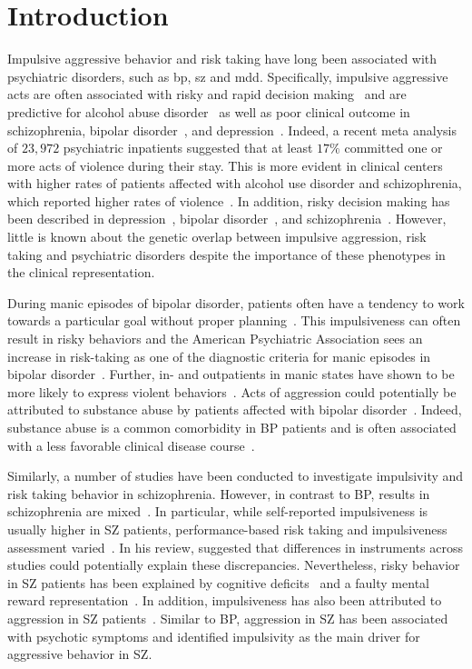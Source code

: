 \section{Introduction}
\label{sec:uk_biobank_psych_introduction}

Impulsive aggressive behavior and risk taking have long been associated with psychiatric disorders, such as \acrfull{bp}, \acrfull{sz} and \acrfull{mdd}.
Specifically, impulsive aggressive acts are often associated with risky and rapid decision making~\cite{Moeller2001} and are predictive for alcohol abuse disorder~\cite{Courtney2012} as well as poor clinical outcome in schizophrenia, bipolar disorder~\cite{Gut-Fayand2001}, and depression~\cite{Dutton2013}.
Indeed, a recent meta analysis of $23,972$ psychiatric inpatients suggested that at least $17\%$ committed one or more acts of violence during their stay.
This is more evident in clinical centers with higher rates of patients affected with alcohol use disorder and schizophrenia, which reported higher rates of violence~\cite{Iozzino2015}. 
In addition, risky decision making has been described in depression~\cite{Wilson2010}, bipolar disorder~\cite{Johnson2012}, and schizophrenia~\cite{Cheng2012}.
However, little is known about the genetic overlap between impulsive aggression, risk taking and psychiatric disorders despite the importance of these phenotypes in the clinical representation.

During manic episodes of bipolar disorder, patients often have a tendency to work towards a particular goal without proper planning~\cite{Johnson2012}.
This impulsiveness can often result in risky behaviors and the American Psychiatric Association sees an increase in risk-taking as one of the diagnostic criteria for manic episodes in bipolar disorder~\cite{APA1994,AmericanPsychiatricAssociation2013}.
Further, in- and outpatients in manic states have shown to be more likely to express violent behaviors~\cite{Ballester2012}.
Acts of aggression could potentially be attributed to substance abuse by patients affected with bipolar disorder~\cite{Fazel2010}.
Indeed, substance abuse is a common comorbidity in BP patients and is often associated with a less favorable clinical disease course~\cite{Cassidy2001}.

Similarly, a number of studies have been conducted to investigate impulsivity and risk taking behavior in schizophrenia.
However, in contrast to BP, results in schizophrenia are mixed~\cite{Reddy2014}.
In particular, while self-reported impulsiveness is usually higher in SZ patients, performance-based risk taking and impulsiveness assessment varied~\cite{Ouzir2013}.
In his review, \citet{Ouzir2013} suggested that differences in instruments across studies could potentially explain these discrepancies.
Nevertheless, risky behavior in SZ patients has been explained by cognitive deficits~\cite{Cheng2012} and a faulty mental reward representation~\cite{Heerey2011}.
In addition, impulsiveness has also been attributed to aggression in SZ patients~\cite{Hoptman2015}.
Similar to BP, aggression in SZ has been associated with psychotic symptoms and \citet{Hoptman2015} identified impulsivity as the main driver for aggressive behavior in SZ\@.

